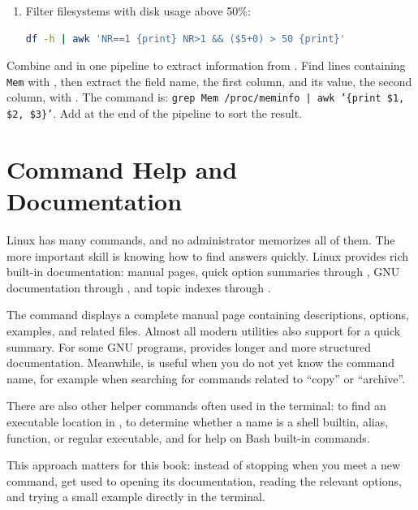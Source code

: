 \begin{enumerate}
    \item Filter filesystems with disk usage above 50\%:
\begin{lstlisting}[language=bash, caption={Filtering with an awk condition}]
df -h | awk 'NR==1 {print} NR>1 && ($5+0) > 50 {print}'
\end{lstlisting}
\end{enumerate}

\begin{challengebox}
Combine  and  in one pipeline to extract information from . Find lines containing \texttt{Mem} with , then extract the field name, the first column, and its value, the second column, with . The command is: \texttt{grep Mem /proc/meminfo | awk '\{print \$1, \$2, \$3\}'}. Add  at the end of the pipeline to sort the result.
\end{challengebox}

\section{Command Help and Documentation}
\label{sec:command-documentation}

Linux has many commands, and no administrator memorizes all of them. The more important skill is knowing how to find answers quickly. Linux provides rich built-in documentation: manual pages, quick option summaries through , GNU documentation through , and topic indexes through .

The  command displays a complete manual page containing descriptions, options, examples, and related files. Almost all modern utilities also support  for a quick summary. For some GNU programs,  provides longer and more structured documentation. Meanwhile,  is useful when you do not yet know the command name, for example when searching for commands related to ``copy'' or ``archive''.

There are also other helper commands often used in the terminal:  to find an executable location in ,  to determine whether a name is a shell builtin, alias, function, or regular executable, and  for help on Bash built-in commands.

This approach matters for this book: instead of stopping when you meet a new command, get used to opening its documentation, reading the relevant options, and trying a small example directly in the terminal.

